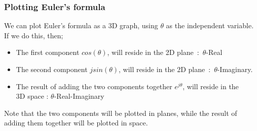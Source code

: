 \begin{frame}[t]

	\frametitle{Plotting Euler's formula}

	We can plot Euler's formula as a 3D graph, using \(\theta\) as the independent variable. If we do this, then;

	\begin{itemize}
		\item   The first component \(cos(\theta)\), will reside in the 2D plane~:~\(\theta\)-Real
		\item   The second component \(jsin(\theta)\), will reside in the 2D plane~:~\(\theta\)-Imaginary.
		\item   The result of adding the two components together \(e^{j\theta}\), will reside in the \\
				3D space : \(\theta\)-Real-Imaginary
	\end{itemize}

	Note that the two components will be plotted in planes, while the result of adding them together will be plotted in space.

\end{frame}
